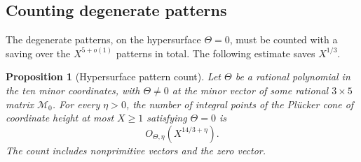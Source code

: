 \documentclass[11pt]{article}
\newtheorem{proposition}[theorem]{Proposition}
\theoremstyle{definition}
\theoremstyle{remark}
\begin{document}
\subsection{Counting degenerate patterns}

The degenerate patterns, on the hypersurface $\Theta=0$, must be counted with a saving over
the $X^{5+o(1)}$ patterns in total. The following estimate saves $X^{1/3}$.

\begin{proposition}[Hypersurface pattern count]\label{prop:polarpatterns}
Let $\Theta$ be a rational polynomial in the ten minor coordinates, with
$\Theta\ne0$ at the minor vector of some rational $3\times5$ matrix $\mathcal M_0$.
For every $\eta>0$, the number of integral points of the Pl\"ucker cone of
coordinate height at most $X\ge1$ satisfying $\Theta=0$ is
\[
 O_{\Theta,\eta}(X^{14/3+\eta}).
\]
The count includes nonprimitive vectors and the zero vector.
\end{proposition}
\end{document}

